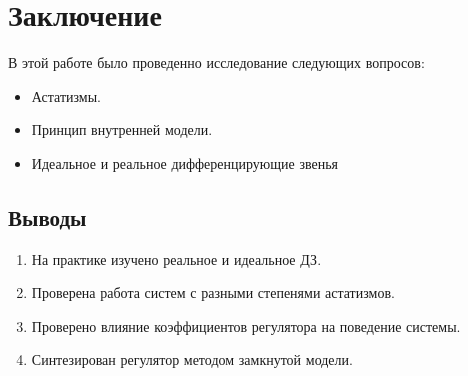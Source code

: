 \documentclass[16pt]{article}
\begin{document}
\newpage
\section{Заключение}
В этой работе было проведенно исследование следующих вопросов:
\begin{itemize}
    \item Астатизмы.
    \item Принцип внутренней модели.
    \item Идеальное и реальное дифференцирующие звенья
\end{itemize} 
\subsection{Выводы}
\begin{enumerate}
   \item На практике изучено реальное и идеальное ДЗ.
   \item Проверена работа систем с разными степенями астатизмов. 
   \item Проверено влияние коэффициентов регулятора на поведение системы.
   \item Синтезирован регулятор методом замкнутой модели.
\end{enumerate}
\end{document}
